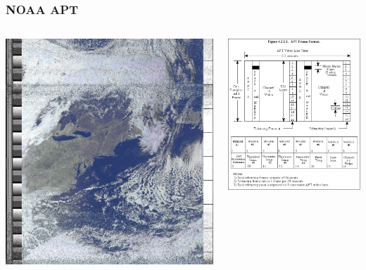 \documentclass[]{beamer}
\begin{document}
\begin{frame}
    \frametitle{NOAA APT}
    \begin{columns}[T]
        \begin{column}[T]{5cm}
            \includegraphics[height=0.5\paperwidth]{images/noaa-19-03-10-2017-1941-hvct.jpg}
        \end{column}
        \begin{column}[T]{5cm}
            \includegraphics[height=0.5\paperwidth]{images/NOAA_APT_Frame_Format.png}
        \end{column}
    \end{columns}
\end{frame}
\end{document}
